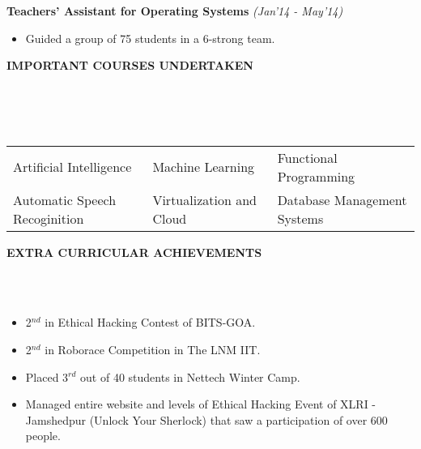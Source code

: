 \documentclass[a4paper,10pt]{article}
\newcommand{\lsep}{-0.5cm}
\newcommand{\resheading}[1]{{\small \colorbox{mygrey}{\begin{minipage}{0.975\textwidth}{\textbf{#1 \vphantom{p\^{E}}}}\end{minipage} \hspace{0.2cm}}}}
\begin{document}
\indent\small{\textbf{Teachers’ Assistant for Operating Systems}}			\hfill	\small{\textit{(Jan'14 - May'14)}}
\begin{itemize}
 \item Guided a group of 75 students in a 6-strong team.
\end{itemize}

\resheading{\textbf{IMPORTANT COURSES UNDERTAKEN}}\\[\lsep]
\\ \\
\indent \begin{tabular*}{\textwidth}{@{\extracolsep{\fill}}lll}
Artificial Intelligence		&	Machine Learning		&	Functional Programming \\
Automatic Speech Recoginition	&	Virtualization and Cloud	&	Database Management Systems
\end{tabular*}

\resheading{\textbf{EXTRA CURRICULAR ACHIEVEMENTS}}\\[\lsep]
\\
\begin{itemize}
 \item 2$^{nd}$ in Ethical Hacking Contest of BITS-GOA.
 \item 2$^{nd}$ in Roborace Competition in The LNM IIT.
 \item Placed 3$^{rd}$ out of 40 students in Nettech Winter Camp.
 \item Managed entire website and levels of Ethical Hacking Event of XLRI - Jamshedpur (Unlock Your Sherlock) that saw a participation of over 600 people.
\end{itemize}
\end{document}
